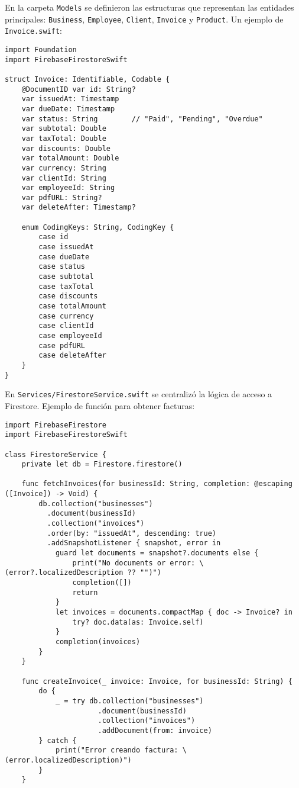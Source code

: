 \begin{large}

En la carpeta \texttt{Models} se definieron las estructuras que representan las entidades principales: \texttt{Business}, \texttt{Employee}, \texttt{Client}, \texttt{Invoice} y \texttt{Product}. Un ejemplo de \texttt{Invoice.swift}:

\begin{verbatim}
import Foundation
import FirebaseFirestoreSwift

struct Invoice: Identifiable, Codable {
    @DocumentID var id: String?
    var issuedAt: Timestamp
    var dueDate: Timestamp
    var status: String        // "Paid", "Pending", "Overdue"
    var subtotal: Double
    var taxTotal: Double
    var discounts: Double
    var totalAmount: Double
    var currency: String
    var clientId: String
    var employeeId: String
    var pdfURL: String?
    var deleteAfter: Timestamp?
    
    enum CodingKeys: String, CodingKey {
        case id
        case issuedAt
        case dueDate
        case status
        case subtotal
        case taxTotal
        case discounts
        case totalAmount
        case currency
        case clientId
        case employeeId
        case pdfURL
        case deleteAfter
    }
}
\end{verbatim}

En \texttt{Services/FirestoreService.swift} se centralizó la lógica de acceso a Firestore. Ejemplo de función para obtener facturas:

\begin{verbatim}
import FirebaseFirestore
import FirebaseFirestoreSwift

class FirestoreService {
    private let db = Firestore.firestore()

    func fetchInvoices(for businessId: String, completion: @escaping ([Invoice]) -> Void) {
        db.collection("businesses")
          .document(businessId)
          .collection("invoices")
          .order(by: "issuedAt", descending: true)
          .addSnapshotListener { snapshot, error in
            guard let documents = snapshot?.documents else {
                print("No documents or error: \(error?.localizedDescription ?? "")")
                completion([])
                return
            }
            let invoices = documents.compactMap { doc -> Invoice? in
                try? doc.data(as: Invoice.self)
            }
            completion(invoices)
        }
    }

    func createInvoice(_ invoice: Invoice, for businessId: String) {
        do {
            _ = try db.collection("businesses")
                      .document(businessId)
                      .collection("invoices")
                      .addDocument(from: invoice)
        } catch {
            print("Error creando factura: \(error.localizedDescription)")
        }
    }


\end{verbatim}
\end{large}
